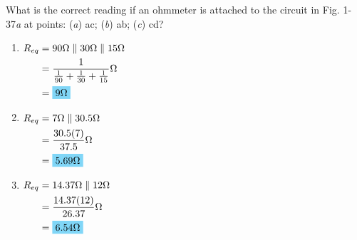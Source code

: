What is the correct reading if an ohmmeter is attached to the circuit in Fig. 1-37\emph{a} at points: (\emph{a}) ac; (\emph{b}) ab; (\emph{c}) cd?
\begin{enumerate}[leftmargin=2cm,labelsep=.5cm,label=\bfseries\alph*)]
	\item $
	\begin{aligned}[t]
	R_{eq} &= 90\qw{\ohm}\parallel 30\qw{\ohm}\parallel 15\qw{\ohm} \\
	&= \frac{1}{\frac{1}{90}+\frac{1}{30}+\frac{1}{15}}\qw{\ohm} \\
	&= \hlbox{9\qw{\ohm}}
	\end{aligned} $
	\\[1cm]
	
	\item $
	\begin{aligned}[t]
	R_{eq} &= 7\qw{\ohm}\parallel 30.5\qw{\ohm} \\
	&= \frac{30.5(7)}{37.5}\qw{\ohm} \\
	&= \hlbox{5.69\qw{\ohm}}
	\end{aligned} $
	\\[1cm]
	
	\item $
	\begin{aligned}[t]
	R_{eq} &= 14.37\qw{\ohm}\parallel 12\qw{\ohm} \\
	&= \frac{14.37(12)}{26.37}\qw{\ohm} \\
	&= \hlbox{6.54\qw{\ohm}}
	\end{aligned} $
	\\[1cm]
\end{enumerate}